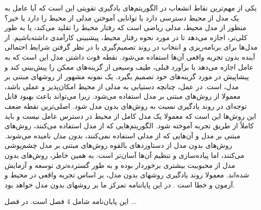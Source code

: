 یکی از مهم‌ترین نقاط انشعاب در الگوریتم‌‌های یادگیری تقویتی این است که آیا عامل به یک مدل از محیط دسترسی دارد یا  توانایی آموختن مدلی از محیط را دارد یا خیر؟ منظور از مدل محیط، مدلی ریاضی است که رفتار محیط را تقلید می‌کند، یا به طور کلی‌تر، اجازه می‌دهد تا در مورد نحوه رفتار محیط، پیشبینی کارآمدی داشته‌باشیم. از مدل‌ها برای برنامه‌ریزی و انتخاب در روند تصمیم‌گیری  با در نظر گرفتن شرایط احتمالی آینده بدون تجربه واقعی آن‌ها استفاده می‌شود.
نقطه قوت داشتن مدل این است که به عامل اجازه می‌دهد با برآورد قبلی، طیف وسیعی از گزینه‌های ممکن را پیش‌بینی کند و پیشاپیش در مورد گزینه‌های خود تصمیم بگیرد. یک نمونه مشهور از روش\nf های مبتنی بر مدل، 
 است. در عمل، چنانچه دستیابی به مدلی از محیط امکان‌پذیر و عملی باشد، معمولا از روش‌های مبتنی بر مدل استفاده می‌شود. زیرا می‌تواند باعث بهبود قابل توجه‌ای در روند یادگیری نسبت به روش‌های بدون مدل شود. اصلی‌ترین نقطه ضعف این روش‌ها این است که معمولا یک مدل کامل از محیط  در دسترس عامل نیست و باید کاملاً از طریق تجربه آموخته ‌شود. الگوریتم‌هایی که از مدل استفاده می‌کنند، روش‌های مبتنی بر مدل و آن‌هایی که از مدلی استفاده نمی‌کنند، \textit{بدون مدل} نامیده می‌شوند. روش‌های بدون مدل از دستاوردهای بالقوه روش‌های مبتنی بر مدل چشم‌پوشی می‌کنند‌، اما پیاده‌سازی و تنظیم آن‌ها آسان‌تر است. به همین خاطر، روش‌های بدون مدل از محبوبیت بیشتری برخوردار بوده و به طور گسترده‌تری توسعه و آزمایش شده‌اند.  معمولا روند یادگیری روش\nf های بدون مدل، بر اساس تجربه واقعی در محیط و آزمون و خطا است \cite{suttonbook}. در این پایان\nf نامه تمرکز ما بر روش\nf های بدون مدل خواهد بود.





این پایان‌نامه شامل 4 فصل است. در فصل ...

